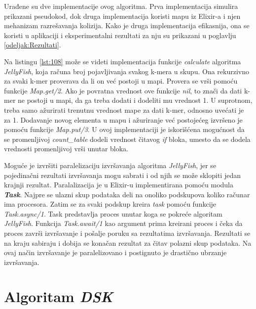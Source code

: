 \documentclass[12pt,oneside]{memoir}
\begin{document}
% 

Urađene su  dve implementacije ovog algoritma. Prva implementacija simulira prikazani pseudokod, dok druga implementacija koristi mapu iz Elixir-a i njen mehanizam razrešavanja kolizija. Kako je druga implementacija efikasnija, ona se koristi u aplikaciji i eksperimentalni rezultati za nju su prikazani u poglavlju \ref{odeljak:Rezultati}. 

Na listingu \ref{lst:108} može se videti implementacija funkcije \textit{calculate} algoritma \textit{JellyFish}, koja računa broj pojavljivanja svakog k-mera u skupu. Ona rekurzivno za svaki k-mer proverava da li on već postoji u mapi. Provera se vrši pomoću funkcije \textit{Map.get/2}. Ako je povratna vrednost ove funkcije \textit{nil}, to znači da dati k-mer ne postoji u mapi, da ga treba dodati i dodeliti mu vrednost 1. U suprotnom, treba samo ažurirati trenutnu vrednost mape za dati k-mer, odnosno uvećati je za 1. Dodavanje novog elementa u mapu i ažuriranje već postojećeg izvršeno je pomoću funkcije \textit{Map.put/3}. U ovoj implementaciji je iskorišćena mogućnost da se promenljivoj \textit{count\_table} dodeli vrednost čitavog \textit{if} bloka, umesto da se dodela vrednosti promenljivoj vrši unutar bloka.



Moguće je izvršiti paralelizaciju izvršavanja algoritma \textit{JellyFish}, jer se pojedinačni rezultati izvršavanja mogu sabrati i od njih se može sklopiti jedan krajnji rezultat. Paralalizacija je u Elixir-u implementirana pomoću modula \textit{\textbf{Task}}. Najpre se ulazni skup podataka deli na onoliko podskupova koliko računar ima procesora. Zatim se za svaki podskup kreira \textit{task} pomoću funkcije \textit{Task.async/1}. Task predstavlja proces unutar koga se pokreće algoritam \textit{JellyFish}. Funkcija \textit{Task.await/1} kao argument prima kreirani proces i čeka da proces završi izvršavanje i pošalje poruku sa rezultatima izvršavanja. Rezultati se na kraju sabiraju i dobija se konačan rezultat za čitav polazni skup podataka. Na ovaj način izvršavanje je paralelizovano i postignuto je drastično ubrzanje izvršavanja.

\section{Algoritam \textit{DSK}}
\label{odeljak:DSK}
\end{document}
